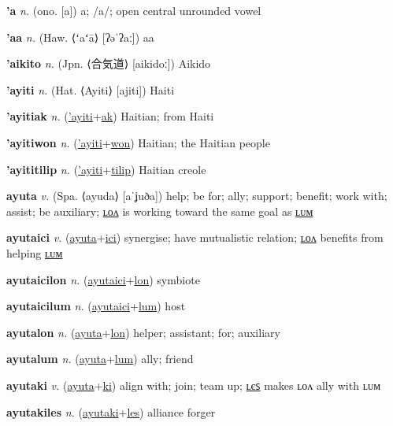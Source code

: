 \textbf{\hypertarget{'a}{'a}} \textit{n.} (ono. [a])
a; /a/; open central unrounded vowel

\textbf{\hypertarget{'aa}{'aa}} \textit{n.} (Haw. ⟨ʻaʻā⟩ [ʔəˈʔaː])
aa

\textbf{\hypertarget{'aikito}{'aikito}} \textit{n.} (Jpn. ⟨{\japanese{}合気道}⟩ [aikidoː])
Aikido

\textbf{\hypertarget{'ayiti}{'ayiti}} \textit{n.} (Hat. ⟨Ayiti⟩ [ajiti])
Haiti

\textbf{\hypertarget{'ayitiak}{'ayitiak}} \textit{n.} (\hyperlink{'ayiti}{'ayiti}+\allowbreak \hyperlink{ak}{ak})
Haitian; from Haiti

\textbf{\hypertarget{'ayitiwon}{'ayitiwon}} \textit{n.} (\hyperlink{'ayiti}{'ayiti}+\allowbreak \hyperlink{won}{won})
Haitian; the Haitian people

\textbf{\hypertarget{'ayititilip}{'ayititilip}} \textit{n.} (\hyperlink{'ayiti}{'ayiti}+\allowbreak \hyperlink{tilip}{tilip})
Haitian creole

\textbf{\hypertarget{ayuta}{ayuta}} \textit{v.} (Spa. ⟨ayuda⟩ [aˈʝuða])
help; be for; ally; support; benefit; work with; assist; be auxiliary; \hyperlink{ayutalon}{ʟᴏᴧ} is working toward the same goal as \hyperlink{ayutalum}{ʟᴜᴍ}

\textbf{\hypertarget{ayutaici}{ayutaici}} \textit{v.} (\hyperlink{ayuta}{ayuta}+\allowbreak \hyperlink{ici}{ici})
synergise; have mutualistic relation; \hyperlink{ayutaicilon}{ʟᴏᴧ} benefits from helping \hyperlink{ayutaicilum}{ʟᴜᴍ}

\textbf{\hypertarget{ayutaicilon}{ayutaicilon}} \textit{n.} (\hyperlink{ayutaici}{ayutaici}+\allowbreak \hyperlink{lon}{lon})
symbiote

\textbf{\hypertarget{ayutaicilum}{ayutaicilum}} \textit{n.} (\hyperlink{ayutaici}{ayutaici}+\allowbreak \hyperlink{lum}{lum})
host

\textbf{\hypertarget{ayutalon}{ayutalon}} \textit{n.} (\hyperlink{ayuta}{ayuta}+\allowbreak \hyperlink{lon}{lon})
helper; assistant; for; auxiliary

\textbf{\hypertarget{ayutalum}{ayutalum}} \textit{n.} (\hyperlink{ayuta}{ayuta}+\allowbreak \hyperlink{lum}{lum})
ally; friend

\textbf{\hypertarget{ayutaki}{ayutaki}} \textit{v.} (\hyperlink{ayuta}{ayuta}+\allowbreak \hyperlink{ki}{ki})
align with; join; team up; \hyperlink{ayutakiles}{ʟєꜱ} makes ʟᴏᴧ ally with ʟᴜᴍ

\textbf{\hypertarget{ayutakiles}{ayutakiles}} \textit{n.} (\hyperlink{ayutaki}{ayutaki}+\allowbreak \hyperlink{les}{les})
alliance forger


